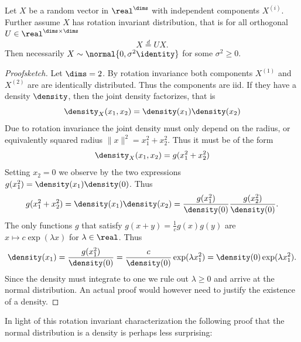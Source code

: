 \begin{fact}
    Let \(X\) be a random vector in \(\real^\dims\) with independent components
    \(X^{(i)}\). Further assume \(X\) has rotation invariant distribution, that is
    for all orthogonal \(U\in \real^{\dims\times \dims}\)
    \[
        X \overset{d}= U X.
    \]
    Then necessarily \(X\sim \normal{0, \sigma^2 \identity}\) for some \(\sigma^2 \ge 0\).
\end{fact}
\begin{proof}[Proofsketch]
    Let \(\dims=2\). By rotation invariance both components \(X^{(1)}\) and
    \(X^{(2)}\) are are identically distributed. Thus the components are iid. If
    they have a density \(\density\), then the joint density factorizes, that is
    \[
        \density_X(x_1, x_2) = \density(x_1) \density(x_2)
    \]
    Due to rotation invariance the joint density must only depend on the
    radius, or equivalently squared radius \(\|x\|^2 = x_1^2 + x_2^2\).
    Thus it must be of the form
    \[
        \density_X(x_1, x_2) = g(x_1^2 + x_2^2)
    \]
    Setting \(x_2=0\) we observe by the two expressions \(g(x_1^2) = \density(x_1)\density(0)\).
    Thus
    \[
        g(x_1^2 + x_2^2) = \density(x_1) \density(x_2) = \frac{g(x_1^2)}{\density(0)} \frac{g(x_2^2)}{\density(0)}.
    \]
    The only functions \(g\) that satisfy \(g(x+y) = \frac1c g(x) g(y)\) are \(x\mapsto c\exp(\lambda x)\)
    for \(\lambda\in \real\). Thus
    \[
        \density(x_1) = \frac{g(x_1^2)}{\density(0)} = \frac{c}{\density(0)} \exp(\lambda x_1^2)
        = \density(0) \exp(\lambda x_1^2).
    \]
    Since the density must integrate to one we rule out \(\lambda \ge 0\) and
    arrive at the normal distribution. An actual proof would
    however need to justify the existence of a density.
\end{proof}

In light of this rotation invariant characterization the following proof that
the normal distribution is a density is perhaps less surprising:

